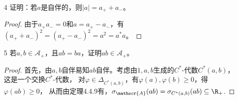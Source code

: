 \begin{enumerate}
\begin{proof}
\begin{align*}
    &=r\big(b^{\frac{\alpha-\beta}{4}}b^{-\frac{\alpha+\beta}{4}}a^\frac{\alpha+\beta}{2}b^{-\frac{\alpha+\beta}{4}}b^{-\frac{\alpha-\beta}{4}}\big) \quad (r(xy)=r(yx))\\
    &=r\big(b^{-\frac{\beta}{2}}a^\frac{\alpha+\beta}{2}b^{-\frac{\alpha}{2}}\big)\\
    &\leqslant\big\|b^{-\frac{\beta}{2}}a^\frac{\alpha+\beta}{2}b^{-\frac{\alpha}{2}}\big\|\\
    &\leqslant\big\|b^{-\frac{\beta}{2}}a^\frac{\beta}{2}\big\|\big\|a^\frac{\alpha}{2}b^{-\frac{\alpha}{2}}\big\|\leqslant1,
\end{align*}
其中最后一行是因为
\[\|a^\frac{\alpha}{2}b^{-\frac{\alpha}{2}}\|^2
=\big\|(a^\frac{\alpha}{2}b^{-\frac{\alpha}{2}})^*(a^\frac{\alpha}{2}b^{-\frac{\alpha}{2}})\big\|
=\big\|b^{-\frac{\alpha}{2}}a^{\alpha}b^{-\frac{\alpha}{2}}\big\|\leqslant1.\]
    
(ii) 考虑Gelfand表示
\[\Lambda_b\colon C^*(b) \to C(\Delta_b),\quad1\mapsto1,b\mapsto\hat{b},\]
则$\{\varphi(b):\varphi\in\Delta\}=\sigma(b)\subseteq\R_+$，
由定理4.4.13 (系$\|b\|=\|\hat{b}\|_\infty$)，$\|b\|-\hat{b}$是非负函数，从而
\[\sigma(\|b\|-b)=\{(\|b\|-\hat{b})(\varphi):\varphi\in\Delta_b\},\]
即$\|b\|-b\geqslant0$。进一步，$\mathscr{A}_+$是闭锥（命题4.4.24）推出$\|b\|-a\geqslant0$。

再考虑Gelfand表示
\[\Lambda_a\colon C^*(a) \to C(\Delta_a),\quad1\mapsto1,a\mapsto\hat{a},\]
有\[\sigma(\|b\|-a)=\{(\|b\|-\hat{a})(\varphi):\varphi\in\Delta_a\},\]
上一段的结论表明$\sigma(\|b\|-a)\subseteq\R_+$，即$\|b\|-\hat{a}$是非负函数，
也就是$\|b\|\geqslant\|\hat{a}\|_\infty$，又由定理4.4.13，$\|\hat{a}\|_\infty=\|a\|$。
    
(iii) 由于$b-a\geqslant0$，存在$d$使得$b-a=d^*d$，
从而$cbc^*-cac^*=c(b-a)c^*=cd^*dc^*=(dc^*)^*dc^*\geqslant0$。
\end{proof}

\item[4] 证明：若$a$是自伴的，则$|a|=a_++a_-$。
\begin{proof}
    由于$a_+a_-=0$和$a=a_+-a_-$，有$(a_++a_-)^2=(a_+-a_-)^2=a^2=a^*a$。
\end{proof}

\item[5] 若$a,b\in\mathscr{A}_+$，且$ab=ba$，证明$ab\in\mathscr{A}_+$。
\begin{proof}
首先，由$a,b$自伴易知$ab$自伴。考虑由$1,a,b$生成的$C^*$-代数$C^*(a,b)$，这是一个交换$C^*$-代数，
对$\varphi\in\Delta_{C^*(a,b)}$，有$\varphi(a),\varphi(b)\geqslant0$，得$\varphi(ab)\geqslant0$，
从而由定理4.4.9有，$\sigma_{\mathscr{A}}(ab)=\sigma_{C^*(a,b)}(ab)\subseteq\R_+$.
\end{proof}


\end{enumerate}
